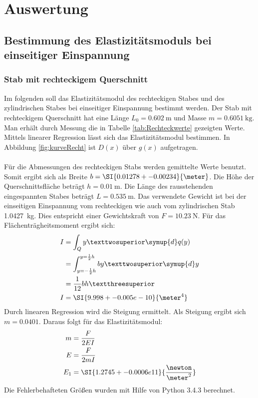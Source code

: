 \section{Auswertung}
\label{sec:Auswertung}
\subsection{Bestimmung des Elastizitätsmoduls bei einseitiger Einspannung}
\subsubsection{Stab mit rechteckigem Querschnitt}
\label{sec:rechteck}
Im folgenden soll das Elastizitätsmodul des rechteckigen Stabes und des zylindrischen Stabes bei einseitiger Einspannung bestimmt werden.
Der Stab mit rechteckigem Querschnitt hat eine Länge $L_0=\SI{0.602}{\meter}$ und Masse $m=\SI{0.6051}{\kilo\gram}$.
Man erhält durch Messung die in Tabelle \ref{tab:Rechteckwerte} gezeigten Werte. Mittels linearer Regression lässt sich das Elastizitätsmodul bestimmen.
In Abbildung \ref{fig:kurveRecht} ist $D(x)$ über $g(x)$ aufgetragen.
\\
\\
Für die Abmessungen des rechteckigen Stabs werden gemittelte Werte benutzt. Somit ergibt sich als Breite $b=\SI{0.01278+-0.00234}{\meter}$.
Die Höhe der Querschnittsfläche beträgt $h=\SI{0.01}{\meter}$. Die Länge des rausstehenden eingespannten Stabes beträgt $L=\SI{0.535}{\meter}$.
Das verwendete Gewicht ist bei der einseitigen Einspannung vom rechteckigen wie auch vom zylindrischen Stab \SI{1.0427}{\kilo\gram}. Dies entspricht einer
Gewichtskraft von $F=\SI{10.23}{\newton}$. Für das Flächenträgheitsmoment ergibt sich:
\begin{align*}
  I &= \int_Q y² \symup{d}q(y) \\
    &= \int_{y=-\frac{1}{2}h}^{y=\frac{1}{2}h} by² \symup{d}y \\
    &= \frac{1}{12}bh³ \\
  I &= \SI{9.998+-0.005e-10}{\meter^4}\\
\end{align*}
Durch linearen Regression wird die Steigung ermittelt. Als Steigung ergibt sich $m=\num{0.0401}$. Daraus folgt für das Elastizitätsmodul:
\begin{align*}
  m   &= \frac{F}{2EI} \\
  E   &= \frac{F}{2mI} \\
  E_1 &= \SI{1.2745+-0.0006e11}{\frac{\newton}{\meter^2}} \\
\end{align*}
Die Fehlerbehafteten Größen wurden mit Hilfe von Python 3.4.3 berechnet.

